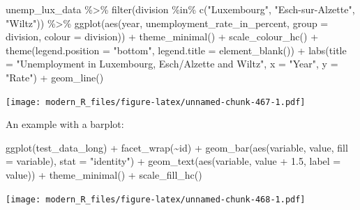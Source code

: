 \documentclass[
]{article}
\newenvironment{Shaded}{\begin{snugshade}}{\end{snugshade}}
\newcommand{\AttributeTok}[1]{\textcolor[rgb]{0.77,0.63,0.00}{#1}}
\newcommand{\FloatTok}[1]{\textcolor[rgb]{0.00,0.00,0.81}{#1}}
\newcommand{\FunctionTok}[1]{\textcolor[rgb]{0.00,0.00,0.00}{#1}}
\newcommand{\NormalTok}[1]{#1}
\newcommand{\SpecialCharTok}[1]{\textcolor[rgb]{0.00,0.00,0.00}{#1}}
\newcommand{\StringTok}[1]{\textcolor[rgb]{0.31,0.60,0.02}{#1}}
\begin{document}
\begin{Shaded}
\begin{Highlighting}[]
\NormalTok{unemp\_lux\_data }\SpecialCharTok{\%\textgreater{}\%}
  \FunctionTok{filter}\NormalTok{(division }\SpecialCharTok{\%in\%} \FunctionTok{c}\NormalTok{(}\StringTok{"Luxembourg"}\NormalTok{, }\StringTok{"Esch{-}sur{-}Alzette"}\NormalTok{, }\StringTok{"Wiltz"}\NormalTok{)) }\SpecialCharTok{\%\textgreater{}\%}
  \FunctionTok{ggplot}\NormalTok{(}\FunctionTok{aes}\NormalTok{(year, unemployment\_rate\_in\_percent, }\AttributeTok{group =}\NormalTok{ division, }\AttributeTok{colour =}\NormalTok{ division)) }\SpecialCharTok{+}
  \FunctionTok{theme\_minimal}\NormalTok{() }\SpecialCharTok{+}
  \FunctionTok{scale\_colour\_hc}\NormalTok{() }\SpecialCharTok{+}
  \FunctionTok{theme}\NormalTok{(}\AttributeTok{legend.position =} \StringTok{"bottom"}\NormalTok{, }\AttributeTok{legend.title =} \FunctionTok{element\_blank}\NormalTok{()) }\SpecialCharTok{+}
  \FunctionTok{labs}\NormalTok{(}\AttributeTok{title =} \StringTok{"Unemployment in Luxembourg, Esch/Alzette and Wiltz"}\NormalTok{, }\AttributeTok{x =} \StringTok{"Year"}\NormalTok{, }\AttributeTok{y =} \StringTok{"Rate"}\NormalTok{) }\SpecialCharTok{+}
  \FunctionTok{geom\_line}\NormalTok{()}
\end{Highlighting}
\end{Shaded}

\texttt{[image: modern\_R\_files/figure-latex/unnamed-chunk-467-1.pdf]}

An example with a barplot:

\begin{Shaded}
\begin{Highlighting}[]
\FunctionTok{ggplot}\NormalTok{(test\_data\_long) }\SpecialCharTok{+}
  \FunctionTok{facet\_wrap}\NormalTok{(}\SpecialCharTok{\textasciitilde{}}\NormalTok{id) }\SpecialCharTok{+}
  \FunctionTok{geom\_bar}\NormalTok{(}\FunctionTok{aes}\NormalTok{(variable, value, }\AttributeTok{fill =}\NormalTok{ variable), }\AttributeTok{stat =} \StringTok{"identity"}\NormalTok{) }\SpecialCharTok{+}
  \FunctionTok{geom\_text}\NormalTok{(}\FunctionTok{aes}\NormalTok{(variable, value }\SpecialCharTok{+} \FloatTok{1.5}\NormalTok{, }\AttributeTok{label =}\NormalTok{ value)) }\SpecialCharTok{+}
  \FunctionTok{theme\_minimal}\NormalTok{() }\SpecialCharTok{+}
  \FunctionTok{scale\_fill\_hc}\NormalTok{()}
\end{Highlighting}
\end{Shaded}

\texttt{[image: modern\_R\_files/figure-latex/unnamed-chunk-468-1.pdf]}
\end{document}
